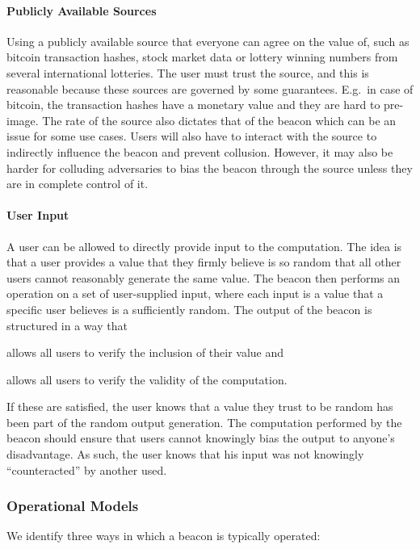 \paragraph{Publicly Available Sources} Using a publicly available source that everyone can agree on the value of, such as bitcoin transaction hashes, stock market data or lottery winning numbers from several international lotteries.
The user must trust the source, and this is reasonable because these sources are governed by some guarantees. E.g.\ in case of bitcoin, the transaction hashes have a monetary value and they are hard to pre-image. The rate of the source also dictates that of the beacon which can be an issue for some use cases. Users will also have to interact with the source to indirectly influence the beacon and prevent collusion. However, it may also be harder for colluding adversaries to bias the beacon through the source unless they are in complete control of it.

\paragraph{User Input}
A user can be allowed to directly provide input to the computation.
The idea is that a user provides a value that they firmly believe is so random that all other users cannot reasonably generate the same value.
The beacon then performs an operation on a set of user-supplied input, where each input is a value that a specific user believes is a sufficiently random. The output of the beacon is structured in a way that
\begin{eletterate*}
    \item allows all users to verify the inclusion of their value and
    \item allows all users to verify the validity of the computation.
\end{eletterate*}

If these are satisfied, the user knows that a value they trust to be random has been part of the random output generation. The computation performed by the beacon should ensure that users cannot knowingly bias the output to anyone's disadvantage. As such, the user knows that his input was not knowingly \enquote{counteracted} by another used.

\subsubsection{Operational Models}
We identify three ways in which a beacon is typically operated:

